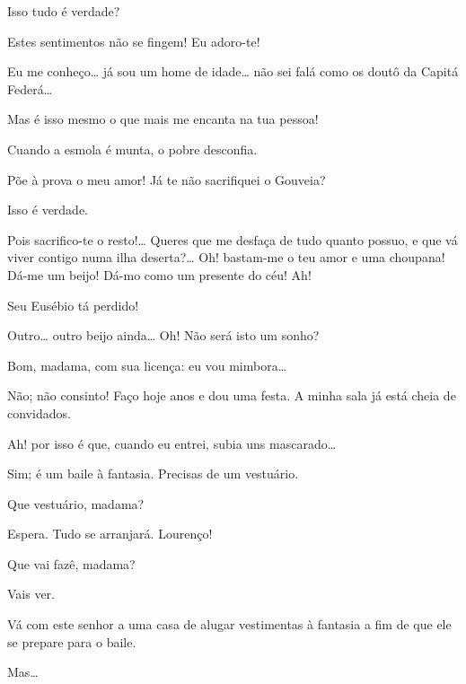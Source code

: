  Isso tudo é verdade?

 Estes sentimentos não se fingem! Eu adoro-te!

 Eu me conheço\ldots{} já sou um home de idade\ldots{} não sei falá como os
doutô da Capitá Federá\ldots{}

 Mas é isso mesmo o que mais me encanta na tua pessoa!

 Cuando a esmola é munta, o pobre desconfia.

 Põe à prova o meu amor! Já te não sacrifiquei o Gouveia?

 Isso é verdade.

 Pois sacrifico-te o resto!\ldots{} Queres que me desfaça de tudo quanto
possuo, e que vá viver contigo numa ilha deserta?\ldots{} Oh! bastam-me o teu amor e uma
choupana!  Dá-me um beijo! Dá-mo como um presente do céu!
 Ah! 

  Seu Eusébio tá perdido! 

  Outro\ldots{} outro beijo ainda\ldots{}  Oh! Não será isto um sonho?

 Bom, madama, com sua licença: eu vou mimbora\ldots{}

 Não; não consinto! Faço hoje anos e dou uma festa. A minha sala já
está cheia de convidados.

 Ah! por isso é que, cuando eu entrei, subia uns mascarado\ldots{}

 Sim; é um baile à fantasia. Precisas de um vestuário.

 Que vestuário, madama?

 Espera. Tudo se arranjará.  Lourenço!

 Que vai fazê, madama?

 Vais ver.


  Vá com este
senhor a uma casa de alugar vestimentas à fantasia a fim de que ele se prepare
para o baile.

 Mas\ldots{}

